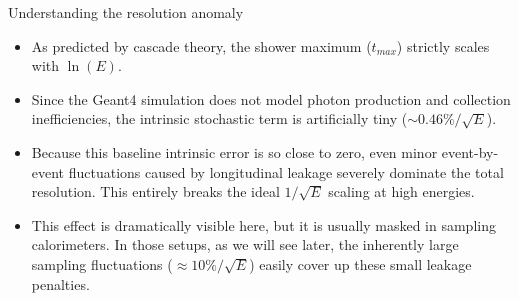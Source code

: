 \begin{frame}{Understanding the resolution anomaly}

    \begin{itemize}
        \item As predicted by cascade theory, the shower maximum ($t_{max}$) strictly scales with $\ln(E)$. 
        
        \vspace{0.3cm}
        
        \item Since the Geant4 simulation does not model photon production and collection inefficiencies, the intrinsic stochastic term is artificially tiny ($\sim 0.46\%/\sqrt{E}$).
        
        \vspace{0.3cm}
        
        \item Because this baseline intrinsic error is so close to zero, even minor event-by-event fluctuations caused by longitudinal leakage severely dominate the total resolution. This entirely breaks the ideal $1/\sqrt{E}$ scaling at high energies.
        
        \vspace{0.3cm}
        
        \item This effect is dramatically visible here, but it is usually masked in sampling calorimeters. In those setups, as we will see later, the inherently large sampling fluctuations ($\approx 10\%/\sqrt{E}$) easily cover up these small leakage penalties.
    \end{itemize}

\end{frame}




